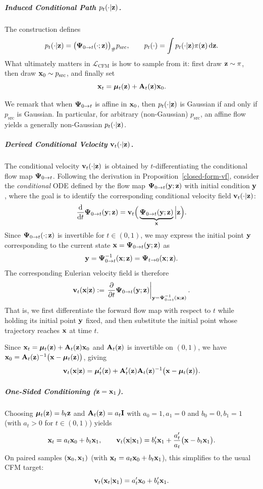 \subparagraph{Induced Conditional Path $p_t(\cdot|{\mathbf{z}})$.}
The construction defines
\[
p_t(\cdot|{\mathbf{z}}) = \bigl({\bm{\Psi}}_{0\to t}( \cdot ;{\mathbf{z}})\bigr)_{\#} p_{\mathrm{src}},
\qquad
p_t(\cdot)  =  \int p_t(\cdot|{\mathbf{z}})\pi({\mathbf{z}})\mathop{}\!\mathrm{d}{\mathbf{z}}.
\]
What ultimately matters in $\mathcal{L}_{\mathrm{CFM}}$ is how to sample from it:  
first draw ${\mathbf{z}} \sim \pi$, then draw ${\mathbf{x}}_0 \sim p_{\mathrm{src}}$, and finally set
\[
{\mathbf{x}}_t = \bm\mu_t({\mathbf{z}}) + {\mathbf{A}}_t({\mathbf{z}}){\mathbf{x}}_0.
\]


We remark that when ${\bm{\Psi}}_{0\to t}$ is affine in ${\mathbf{x}}_0$, then $p_t( \cdot | {\mathbf{z}})$ is Gaussian 
if and only if $p_{\mathrm{src}}$ is Gaussian. 
In particular, for arbitrary (non-Gaussian) $p_{\mathrm{src}}$, an affine flow yields a
generally non-Gaussian $p_t(\cdot|{\mathbf{z}})$.


\subparagraph{Derived Conditional Velocity ${\mathbf{v}}_t(\cdot|{\mathbf{z}})$.} The conditional velocity ${\mathbf{v}}_t(\cdot|{\mathbf{z}})$ is obtained by $t$-differentiating the conditional flow map ${\bm{\Psi}}_{0\to t}$. Following the derivation in Proposition~\ref{closed-form-vf}, consider the \emph{conditional} ODE defined by the flow map ${\bm{\Psi}}_{0\to t}({\mathbf{y}};{\mathbf{z}})$ with initial condition ${\mathbf{y}}$, where the goal is to identify the corresponding conditional velocity field ${\mathbf{v}}_t(\cdot|{\mathbf{z}})$:
\[
\frac{\mathop{}\!\mathrm{d}}{\mathop{}\!\mathrm{d} t} {\bm{\Psi}}_{0\to t}({\mathbf{y}};{\mathbf{z}})
= {\mathbf{v}}_t \Big(\underbrace{{\bm{\Psi}}_{0\to t}({\mathbf{y}};{\mathbf{z}})}_{{\mathbf{x}}} \Big| {\mathbf{z}}\Big).
\]
Since ${\bm{\Psi}}_{0\to t}(\cdot;{\mathbf{z}})$ is invertible for $t\in(0,1)$, we may
express the initial point ${\mathbf{y}}$ corresponding to the current state
${\mathbf{x}}={\bm{\Psi}}_{0\to t}({\mathbf{y}};{\mathbf{z}})$ as
\[
{\mathbf{y}}
=
{\bm{\Psi}}_{0\to t}^{-1}({\mathbf{x}};{\mathbf{z}})
=
{\bm{\Psi}}_{t\to0}({\mathbf{x}};{\mathbf{z}}).
\]
The corresponding Eulerian velocity field is therefore
\[
{\mathbf{v}}_t({\mathbf{x}}|{\mathbf{z}})
:=
\left.
\frac{\partial}{\partial t}
{\bm{\Psi}}_{0\to t}({\mathbf{y}};{\mathbf{z}})
\right|_{{\mathbf{y}}={\bm{\Psi}}_{0\to t}^{-1}({\mathbf{x}};{\mathbf{z}})}.
\]
That is, we first differentiate the forward flow map with respect to $t$
while holding its initial point ${\mathbf{y}}$ fixed, and then substitute the initial
point whose trajectory reaches ${\mathbf{x}}$ at time $t$.


Since ${\mathbf{x}}_t=\bm\mu_t({\mathbf{z}})+{\mathbf{A}}_t({\mathbf{z}}){\mathbf{x}}_0$ and ${\mathbf{A}}_t({\mathbf{z}})$ is invertible on $(0,1)$, we have ${\mathbf{x}}_0={\mathbf{A}}_t({\mathbf{z}})^{-1}\bigl({\mathbf{x}}-\bm\mu_t({\mathbf{z}})\bigr)$, giving
\[
{\mathbf{v}}_t({\mathbf{x}}|{\mathbf{z}})
 = 
\bm\mu_t'({\mathbf{z}}) + {\mathbf{A}}_t'({\mathbf{z}}) {\mathbf{A}}_t({\mathbf{z}})^{-1} \bigl({\mathbf{x}}-\bm\mu_t({\mathbf{z}})\bigr).
\]


\subparagraph{One-Sided Conditioning (${\mathbf{z}}={\mathbf{x}}_1$).}
Choosing $\bm\mu_t({\mathbf{z}})=b_t {\mathbf{z}}$ and ${\mathbf{A}}_t({\mathbf{z}})=a_t {\mathbf{I}}$ with $a_0=1,a_1=0$ and $b_0=0,b_1=1$ (with $a_t>0$ for $t\in(0,1)$) yields
\[
{\mathbf{x}}_t = a_t {\mathbf{x}}_0 + b_t {\mathbf{x}}_1,
\qquad
{\mathbf{v}}_t({\mathbf{x}}|{\mathbf{x}}_1) = b_t' {\mathbf{x}}_1 + \frac{a_t'}{a_t} \bigl({\mathbf{x}}-b_t{\mathbf{x}}_1\bigr).
\]
On paired samples $({\mathbf{x}}_0,{\mathbf{x}}_1)$ (with ${\mathbf{x}}_t=a_t{\mathbf{x}}_0+b_t{\mathbf{x}}_1$), this simplifies to the usual CFM target:
\[
{\mathbf{v}}_t({\mathbf{x}}_t|{\mathbf{x}}_1)=a_t' {\mathbf{x}}_0 + b_t' {\mathbf{x}}_1.
\]

